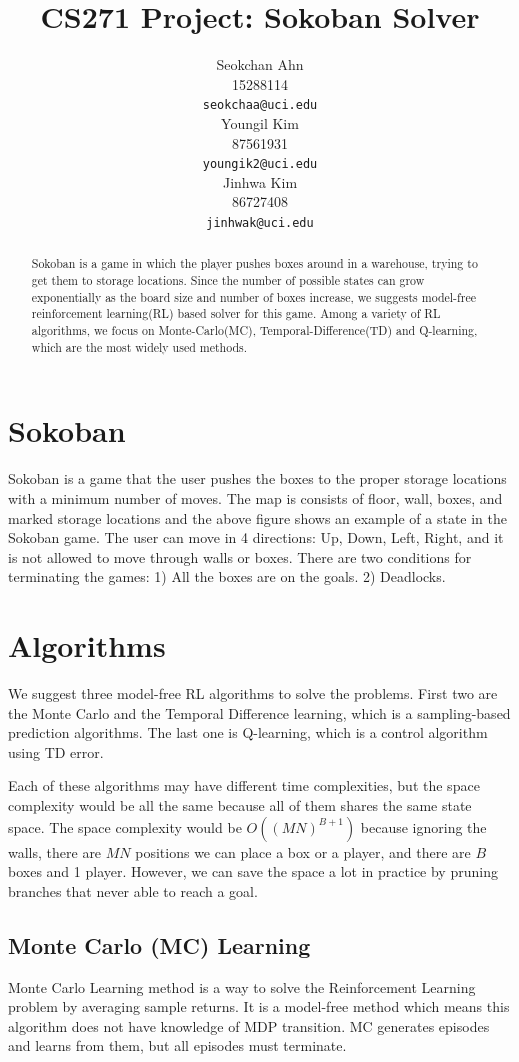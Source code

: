 \documentclass{article}
\title{CS271 Project: Sokoban Solver}
\author{
  Seokchan Ahn\\
  15288114 \\
  \texttt{seokchaa@uci.edu} \\
   \And
  Youngil Kim\\
  87561931\\
  \texttt{youngik2@uci.edu}\\
   \And
  Jinhwa Kim \\
  86727408 \\
  \texttt{jinhwak@uci.edu}
}
\begin{document}
\maketitle

\begin{abstract}
  Sokoban is a game in which the player pushes boxes around in a warehouse, trying to get them to storage locations. Since the number of possible states can grow exponentially as the board size and number of boxes increase, we suggests model-free reinforcement learning(RL) based solver for this game. Among a variety of RL algorithms, we focus on Monte-Carlo(MC), Temporal-Difference(TD) and Q-learning, which are the most widely used methods.
\end{abstract}

\section{Sokoban}
Sokoban is a game that the user pushes the boxes to the proper storage locations with a minimum number of moves. The map is consists of floor, wall, boxes, and marked storage locations and the above figure shows an example of a state in the Sokoban game. The user can move in 4 directions: Up, Down, Left, Right, and it is not allowed to move through walls or boxes. There are two conditions for terminating the games: 1) All the boxes are on the goals. 2) Deadlocks.

\section{Algorithms}

We suggest three model-free RL algorithms to solve the problems. First two are the Monte Carlo and the Temporal Difference learning, which is a sampling-based prediction algorithms. The last one is Q-learning, which is a control algorithm using TD error.

Each of these algorithms may have different time complexities, but the space complexity would be all the same because all of them shares the same state space. The space complexity would be $O((MN)^{B+1})$ because ignoring the walls, there are $MN$ positions we can place a box or a player, and there are $B$ boxes and 1 player. However, we can save the space a lot in practice by pruning branches that never able to reach a goal.

\subsection{Monte Carlo (MC) Learning}
Monte Carlo Learning method is a way to solve the Reinforcement Learning problem by averaging sample returns. It is a model-free method which means this algorithm does not have knowledge of MDP transition. MC generates episodes and learns from them, but all episodes must terminate.
\end{document}
